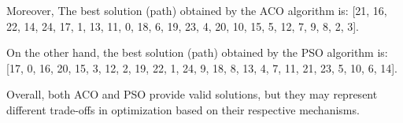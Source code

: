 Moreover, The best solution (path) obtained by the ACO algorithm is:
[21, 16, 22, 14, 24, 17, 1, 13, 11, 0, 18, 6, 19, 23, 4, 20, 10, 15, 5, 12, 7, 9, 8, 2, 3].

On the other hand, the best solution (path) obtained by the PSO algorithm is:
[17, 0, 16, 20, 15, 3, 12, 2, 19, 22, 1, 24, 9, 18, 8, 13, 4, 7, 11, 21, 23, 5, 10, 6, 14].

Overall, both ACO and PSO provide valid solutions, but they may represent different trade-offs in optimization based on their respective mechanisms.

 


